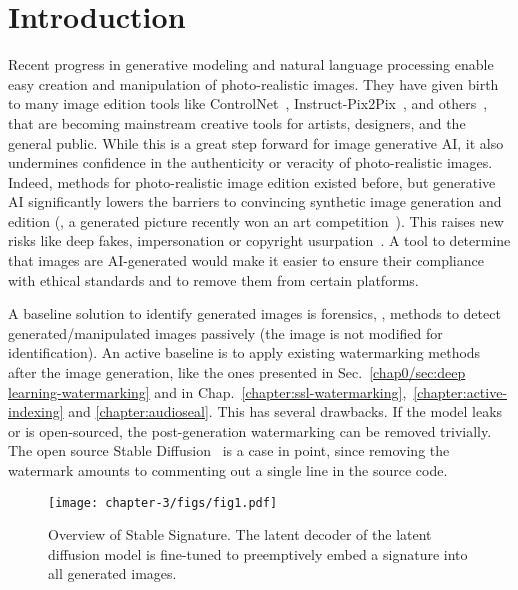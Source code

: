 
\section{Introduction}


Recent progress in generative modeling and natural language processing enable easy creation and manipulation of photo-realistic images.
They have given birth to many image edition tools like ControlNet~\citep{zhang2023adding}, Instruct-Pix2Pix~\citep{brooks2022instructpix2pix}, and others~\citep{couairon2022diffedit, gal2022image, ruiz2022dreambooth}, that are becoming mainstream creative tools for artists, designers, and the general public.
While this is a great step forward for image generative AI, it also undermines confidence in the authenticity or veracity of photo-realistic images. 
Indeed, methods for photo-realistic image edition existed before, but generative AI significantly lowers the barriers to convincing synthetic image generation and edition (\eg, a generated picture recently won an art competition~\citep{gault2022vice}).
This raises new risks like deep fakes, impersonation or copyright usurpation~\citep{brundage2018malicious, denton2021ethical}.
A tool to determine that images are AI-generated would make it easier to ensure their compliance with ethical standards and to remove them from certain platforms. 
    
A baseline solution to identify generated images is forensics, \ie, methods to detect generated/manipulated images passively (the image is not modified for identification).
An active baseline is to apply existing watermarking methods after the image generation, like the ones presented in Sec.~\ref{chap0/sec:deep learning-watermarking} and in Chap.~\ref{chapter:ssl-watermarking},~\ref{chapter:active-indexing} and \ref{chapter:audioseal}.
This has several drawbacks. 
If the model leaks or is open-sourced, the post-generation watermarking can be removed trivially.
The open source Stable Diffusion~\citep{2022stablediffusion} is a case in point, since removing the watermark amounts to commenting out a single line in the source code.

\begin{figure}[t]
    \centering 
    \texttt{[image: chapter-3/figs/fig1.pdf]}
    \caption{
        Overview of Stable Signature. 
        The latent decoder of the latent diffusion model is fine-tuned to preemptively embed a signature into all generated images.
    }
    \label{chap3/fig:fig1}
\end{figure}


